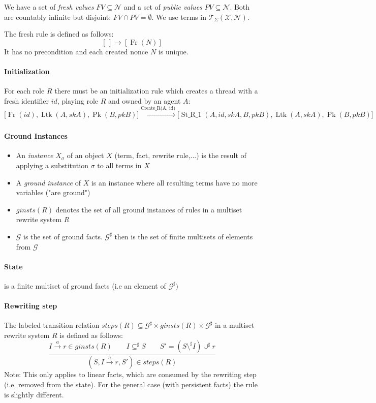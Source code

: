 We have a set of \emph{fresh values} $FV \subseteq \mathcal{N}$ and a set of  \emph{public values} $PV \subseteq \mathcal{N}$. Both are countably infinite but disjoint: $FV \cap PV = \emptyset$. We use terms in $\mathcal{T}_\Sigma (\mathcal{X}, \mathcal{N})$.

The fresh rule is defined as follows:
$$ [\,] \longrightarrow [\operatorname{Fr}(N)] $$
It has no precondition and each created nonce $N$ is unique. 

\paragraph{Initialization}
For each role $R$ there must be an initialization rule which creates a thread with a fresh identifier $id$, playing role $R$ and owned by an agent $A$:
$$
\big[\operatorname{Fr}(id), \operatorname{Ltk}(A, skA), \operatorname{Pk}(B, pkB)\big]
\xrightarrow[\text{}]{\text{Create\_R(A, id)}}
\big[ \operatorname{St\_R\_1}(A, id, skA, B, pkB), \operatorname{Ltk}(A, skA), \operatorname{Pk}(B, pkB) \big]
$$
 
\paragraph{Ground Instances}
\begin{itemize}
     \item An \emph{instance} $X_\sigma$ of an object $X$ (term, fact, rewrite rule,...) is the result of applying a substitution $\sigma$ to all terms in $X$
     \item A \emph{ground instance} of $X$ is an instance where all resulting terms have no more variables ("are ground")
     \item $ginsts(R)$ denotes the set of all ground instances of rules in a multiset rewrite system $R$
     \item $\mathcal{G}$ is the set of ground facts. $\mathcal{G}^\sharp$ then is the set of finite multisets of elements from $\mathcal{G}$
\end{itemize}

\paragraph{State} is a finite multiset of ground facts (i.e an element of $\mathcal{G}^\sharp)$

\paragraph{Rewriting step}
The labeled transition relation $ steps(R) \subseteq \mathcal{G}^{\sharp} \times ginsts(R) \times \mathcal{G}^\sharp$  in a multiset rewrite system $R$ is defined as follows:
$$ \frac{I \xrightarrow{a} r \in ginsts(R) \qquad I \subseteq^\sharp S \qquad S'=(S\setminus^\sharp I)\cup^\sharp r }{(S, I \xrightarrow{a} r, S')\in steps(R) }$$
Note: This only applies to linear facts, which are consumed by the rewriting step (i.e. removed from the state). For the general case (with persistent facts) the rule is slightly different.

